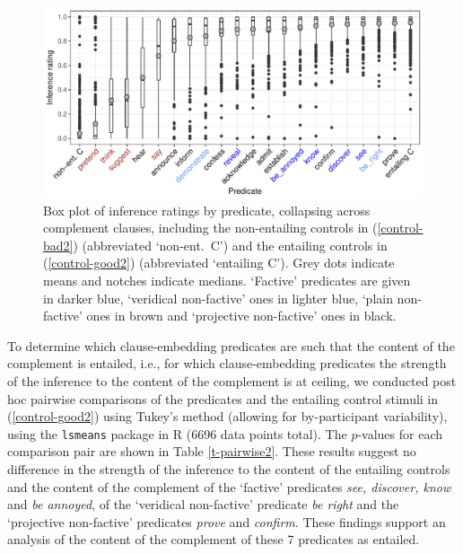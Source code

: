 \documentclass[11pt,fleqn]{article}
\newcommand{\6}{\mbox{$[\hspace*{-.6mm}[$}}
\newcommand{\9}{\mbox{$]\hspace*{-.6mm}]$}}
\begin{document}
\begin{figure}[h!]
\centering

\includegraphics[width=.75\paperwidth]{../results/4-veridicality3/graphs/boxplot-inference}

\caption{Box plot of inference ratings by predicate, collapsing across complement clauses, including the non-entailing controls in (\ref{control-bad2}) (abbreviated `non-ent.\ C') and the entailing controls in (\ref{control-good2}) (abbreviated `entailing C'). Grey dots indicate means and notches indicate medians. `Factive' predicates are given in darker blue, `veridical non-factive' ones in lighter blue, `plain non-factive' ones in brown and `projective non-factive' ones in black.}
\label{f-veridicality-predicate2}
\end{figure}

To determine which clause-embedding predicates are such that the content of the complement is entailed, i.e., for which clause-embedding predicates the strength of the inference to the content of the complement is at ceiling, we conducted post hoc pairwise comparisons of the predicates and the entailing control stimuli in (\ref{control-good2}) using Tukey's method (allowing for by-participant variability), using the \verb|lsmeans| package \citep{tukey} in R \citep{r}  (6696 data points total). The $p$-values for each comparison pair are shown in Table  \ref{t-pairwise2}. These results suggest no difference in the strength of the inference to the content of the entailing controls and the content of the complement of the `factive' predicates {\em see, discover, know} and {\em be annoyed}, of the `veridical non-factive' predicate {\em be right} and the `projective non-factive' predicates {\em prove} and {\em confirm}. These findings support an analysis of the content of the complement of these 7 predicates as entailed.
\end{document}
